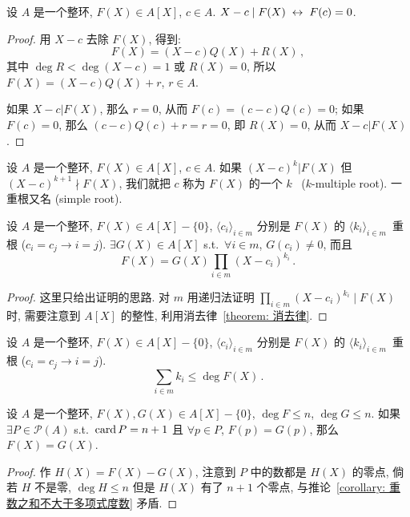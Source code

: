 \documentclass[openany, a5paper, oneside]{ctexbook}
\begin{document}
\begin{theorem}[B\'ezout]\label{theorem: Bezout}
	设 $A$ 是一个整环, $F(X) \in A[X]$, $c \in A$.
	$X - c \mid F(X) \;\leftrightarrow\; F(c) = 0$. 
\end{theorem}
\begin{proof}
	用 $X - c$ 去除 $F(X)$, 得到:
	\begin{equation*}
		F(X) = (X - c) Q(X) + R(X)\,,
	\end{equation*}
	其中 $\deg R < \deg(X - c) = 1$ 或 $R(X) = 0$, 所以 $F(X) = (X - c) Q(X) + r$, $r \in A$.

	如果 $X - c \vert F(X)$, 那么 $r = 0$, 从而 $F(c) = (c - c) Q(c) = 0$; 如果 $F(c) = 0$, 那么 $(c - c)Q(c) + r = r = 0$, 即 $R(X) = 0$, 从而 $X - c \vert F(X)$.
\end{proof}

\begin{definition}[重根]
	设 $A$ 是一个整环, $F(X) \in A[X]$, $c \in A$.
	如果 $(X - c)^k | F(X)$ 但 $(X - c)^{k + 1} \nmid F(X)$, 我们就把 $c$ 称为 $F(X)$ 的一个 $k$~ ($k$-multiple root). 
	一重根又名 (simple root).
\end{definition}

\begin{theorem}
	设 $A$ 是一个整环, $F(X) \in A[X] - \{0\}$, $\langle c_i \rangle_{i \in m}$ 分别是 $F(X)$ 的 $\langle k_i\rangle_{i \in m}$~重根 ($c_i = c_j \to i = j$). 
	$\exists G(X) \in A[X]$ s.t.\ $\forall i \in m$, $G(c_i) \neq 0$, 而且
	\begin{equation*}
		F(X) = G(X) \prod_{i \in m} (X - c_i)^{k_i} \,.
	\end{equation*}
\end{theorem}
\begin{proof}
	这里只给出证明的思路. 对 $m$ 用递归法证明 $\prod_{i \in m} (X - c_i)^{k_i} \mid F(X)$ 时, 需要注意到 $A[X]$ 的整性, 利用消去律~\ref{theorem: 消去律}.
\end{proof}

\begin{corollary}[重数之和不大于多项式度数]\label{corollary: 重数之和不大于多项式度数}
	设 $A$ 是一个整环, $F(X) \in A[X] - \{0\}$, $\langle c_i \rangle_{i \in m}$ 分别是 $F(X)$ 的 $\langle k_i\rangle_{i \in m}$~重根 ($c_i = c_j \to i = j$). 
	\begin{equation*}
		\sum_{i \in m} k_i \leq \deg F(X)\,.
	\end{equation*}
\end{corollary}

\begin{corollary}
	设 $A$ 是一个整环, $F(X), G(X) \in A[X] - \{0\}$, $\deg F \leq n$, $\deg G \leq n$. 
	如果 $\exists P \in \mathscr P(A)$ s.t.\ $\operatorname{card} P = n + 1$ 且 $\forall p \in P$, $F(p) = G(p)$, 那么 $F(X) = G(X)$.
\end{corollary}
\begin{proof}
	作 $H(X) = F(X) - G(X)$, 注意到 $P$ 中的数都是 $H(X)$ 的零点, 倘若 $H$ 不是零, $\deg H \leq n$ 但是 $H(X)$ 有了 $n + 1$ 个零点, 与推论~\ref{corollary: 重数之和不大于多项式度数} 矛盾.
\end{proof}
\end{document}
